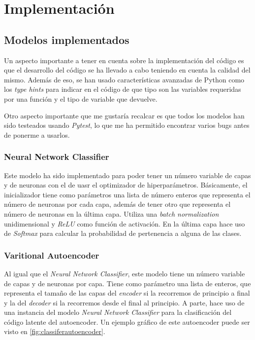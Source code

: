 \chapter{Implementación}

\section{Modelos implementados}

Un aspecto importante a tener en cuenta sobre la implementación del código es que el desarrollo del código se ha llevado a cabo teniendo en cuenta la calidad del mismo. Además de eso, se han usado características avanzadas de Python como los \textit{type hints} para indicar en el código de que tipo son las variables requeridas por una función y el tipo de variable que devuelve.\newline

Otro aspecto importante que me gustaría recalcar es que todos los modelos han sido testeados usando \textit{Pytest}, lo que me ha permitido encontrar varios bugs antes de ponerme a usarlos.

\subsection{Neural Network Classifier}

Este modelo ha sido implementado para poder tener un número variable de capas y de neuronas con el de uasr el optimizador de hiperparámetros. Básicamente, el inicializador tiene como parámetros una lista de número enteros que representa el número de neuronas por cada capa, además de tener otro que representa el número de neuronas en la última capa. Utiliza una \textit{batch normalization} unidimensional y \textit{ReLU} como función de activación. En la última capa hace uso de \textit{Softmax} para calcular la probabilidad de pertenencia a alguna de las clases.

\subsection{Varitional Autoencoder}

Al igual que el \textit{Neural Network Classifier}, este modelo tiene un número variable de capas y de neuronas por capa. Tiene como parámetro una lista de enteros, que representa el tamaño de las capas del \textit{encoder} si la recorremos de principio a final y la del \textit{decoder} si la recorremos desde el final al principio. A parte, hace uso de una instancia del modelo \textit{Neural Network Classifier} para la clasificación del código latente del autoencoder. Un ejemplo gráfico de este autoencoder puede ser visto en \ref{fig:classiferautoencoder}.

